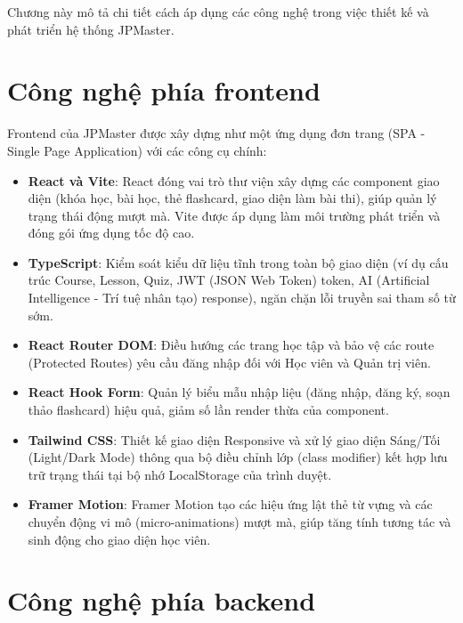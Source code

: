 \documentclass[../DoAn.tex]{subfiles}
\begin{document}
Chương này mô tả chi tiết cách áp dụng các công nghệ trong việc thiết kế và phát triển hệ thống JPMaster.

\section{Công nghệ phía frontend}
\label{section:3.1}

Frontend của JPMaster được xây dựng như một ứng dụng đơn trang (SPA - Single Page Application) với các công cụ chính:
\begin{itemize}
    \item \textbf{React và Vite}: React đóng vai trò thư viện xây dựng các component giao diện (khóa học, bài học, thẻ flashcard, giao diện làm bài thi), giúp quản lý trạng thái động mượt mà. Vite được áp dụng làm môi trường phát triển và đóng gói ứng dụng tốc độ cao.
    \item \textbf{TypeScript}: Kiểm soát kiểu dữ liệu tĩnh trong toàn bộ giao diện (ví dụ cấu trúc Course, Lesson, Quiz, JWT (JSON Web Token) token, AI (Artificial Intelligence - Trí tuệ nhân tạo) response), ngăn chặn lỗi truyền sai tham số từ sớm.
    \item \textbf{React Router DOM}: Điều hướng các trang học tập và bảo vệ các route (Protected Routes) yêu cầu đăng nhập đối với Học viên và Quản trị viên.
    \item \textbf{React Hook Form}: Quản lý biểu mẫu nhập liệu (đăng nhập, đăng ký, soạn thảo flashcard) hiệu quả, giảm số lần render thừa của component.
    \item \textbf{Tailwind CSS}: Thiết kế giao diện Responsive và xử lý giao diện Sáng/Tối (Light/Dark Mode) thông qua bộ điều chỉnh lớp (class modifier) kết hợp lưu trữ trạng thái tại bộ nhớ LocalStorage của trình duyệt.
    \item \textbf{Framer Motion}: Framer Motion tạo các hiệu ứng lật thẻ từ vựng và các chuyển động vi mô (micro-animations) mượt mà, giúp tăng tính tương tác và sinh động cho giao diện học viên.
\end{itemize}

\section{Công nghệ phía backend}
\label{section:3.2}
\end{document}
